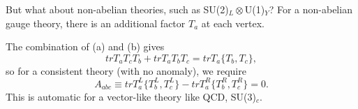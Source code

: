 But what about non-abelian theories, such as SU(2)$_L \otimes$U(1)$_Y$? For a non-abelian gauge theory, there is an additional factor $T_a$ at each vertex.
\begin{figure}[!h]
\end{figure}
The combination of (a) and (b) gives
\begin{equation}
trT_aT_cT_b + trT_aT_bT_c = trT_a\{T_b,T_c\},
\end{equation}
so for a consistent theory (with no anomaly), we require
\begin{equation}
A_{abc} \equiv trT_a^L\{T_b^L,T_c^L\} - trT_a^R\{T_b^R,T_c^R\} = 0.
\end{equation}
This is automatic for a vector-like theory like QCD, SU(3)$_c$.
%
